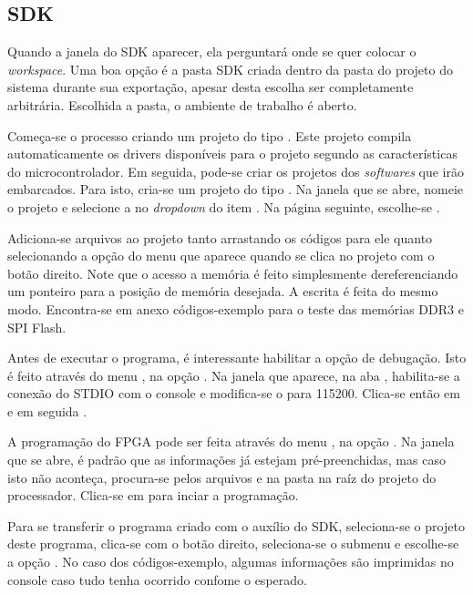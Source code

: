 \documentclass[11pt,a4paper,oneside]{book}
\begin{document}
\subsection{SDK}
Quando a janela do SDK aparecer, ela perguntará onde se quer colocar o \textit{workspace}.
Uma boa opção é a pasta SDK criada dentro da pasta do projeto do sistema durante sua exportação, apesar desta escolha ser completamente arbitrária.
Escolhida a pasta, o ambiente de trabalho é aberto.

Começa-se o processo criando um projeto do tipo .
Este projeto compila automaticamente os drivers disponíveis para o projeto segundo as características do microcontrolador.
Em seguida, pode-se criar os projetos dos \textit{softwares} que irão embarcados.
Para isto, cria-se um projeto do tipo .
Na janela que se abre, nomeie o projeto e selecione a  no \textit{dropdown} do item .
Na página seguinte, escolhe-se .

Adiciona-se arquivos ao projeto tanto arrastando os códigos para ele quanto selecionando a opção  do menu que aparece quando se clica no projeto com o botão direito.
Note que o acesso a memória é feito simplesmente dereferenciando um ponteiro para a posição de memória desejada.
A escrita é feita do mesmo modo.
Encontra-se em anexo códigos-exemplo para o teste das memórias DDR3 e SPI Flash.

Antes de executar o programa, é interessante habilitar a opção de debugação.
Isto é feito através do menu , na opção .
Na janela que aparece, na aba , habilita-se a conexão do STDIO com o console e modifica-se o  para 115200.
Clica-se então em  e em seguida .

A programação do FPGA pode ser feita através do menu , na opção .
Na janela que se abre, é padrão que as informações já estejam pré-preenchidas, mas caso isto não aconteça, procura-se pelos arquivos  e  na pasta  na raíz do projeto do processador.
Clica-se em  para inciar a programação.

Para se transferir o programa criado com o auxílio do SDK, seleciona-se o projeto deste programa, clica-se com o botão direito, seleciona-se o submenu  e escolhe-se a opção .
No caso dos códigos-exemplo, algumas informações são imprimidas no console caso tudo tenha ocorrido confome o esperado.
\end{document}
